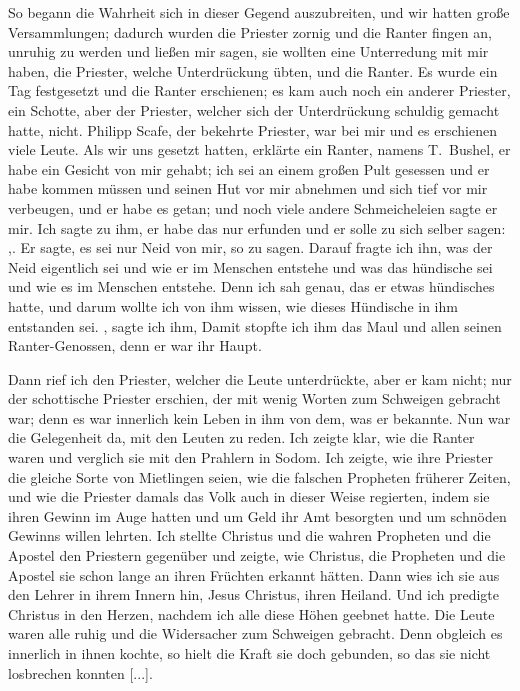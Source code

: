 So begann die Wahrheit sich in dieser Gegend auszubreiten, und
wir hatten große Versammlungen; dadurch wurden die Priester
zornig und die Ranter fingen an, unruhig zu werden und ließen
mir sagen, sie wollten eine Unterredung 
mit mir haben, die Priester,
welche Unterdrückung übten, und die Ranter. Es wurde ein Tag
festgesetzt und die Ranter erschienen; es kam auch noch ein anderer
Priester, ein Schotte, aber der Priester, welcher sich der 
Unterdrückung schuldig gemacht hatte, nicht. 
Philipp Scafe, der 
bekehrte Priester, war bei mir und es erschienen viele Leute. Als
wir uns gesetzt hatten, erklärte ein Ranter, namens 
T.~Bushel,
er habe ein Gesicht von mir gehabt; ich sei an einem großen Pult
gesessen und er habe kommen müssen und seinen Hut vor mir
abnehmen und sich tief vor mir verbeugen, und er habe es getan;
und noch viele andere Schmeicheleien sagte er mir. Ich sagte
zu ihm, er habe das nur erfunden und er solle zu sich selber
sagen: ,. 
Er sagte, es sei nur Neid von
mir, so zu sagen. Darauf fragte ich ihn, was der Neid eigentlich
sei und wie er im Menschen entstehe und was das hündische sei
und wie es im Menschen entstehe. Denn ich sah genau, das er
etwas hündisches hatte, und darum wollte ich von ihm wissen,
wie dieses Hündische in ihm entstanden sei. , sagte ich
ihm,  Damit stopfte ich ihm das Maul und allen seinen 
Ranter-Genossen, denn er war ihr Haupt. 

Dann rief ich den Priester,
welcher die Leute unterdrückte, aber er kam nicht; nur der schottische
Priester erschien, der mit wenig Worten zum Schweigen gebracht
war; denn es war innerlich kein Leben in ihm von dem, was er
bekannte. Nun war die Gelegenheit da, mit den Leuten zu reden.
Ich zeigte klar, wie die Ranter waren und verglich sie mit den
Prahlern in Sodom. Ich zeigte, wie ihre Priester die gleiche
Sorte von Mietlingen seien, wie die falschen Propheten früherer
Zeiten, und wie die Priester damals das Volk auch in dieser
Weise regierten, indem sie ihren Gewinn im Auge hatten und
um Geld ihr Amt besorgten und um schnöden Gewinns willen
lehrten. Ich stellte Christus und die wahren Propheten und die
Apostel den Priestern gegenüber und zeigte, wie Christus, die
Propheten und die Apostel sie schon lange an ihren Früchten
erkannt hätten. Dann wies ich sie aus den Lehrer in ihrem
Innern hin, Jesus Christus, ihren Heiland. Und ich predigte
Christus in den Herzen, nachdem ich alle diese Höhen geebnet
hatte. Die Leute waren alle ruhig und die Widersacher zum
Schweigen gebracht. Denn obgleich es innerlich in ihnen kochte,
so hielt die Kraft sie doch gebunden, so das sie nicht losbrechen
konnten [...].

